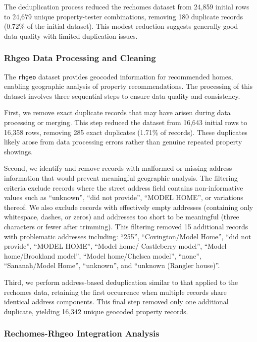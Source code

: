 \documentclass{article}
\begin{document}
The deduplication process reduced the rechomes dataset from 24,859 initial rows to 24,679 unique property-tester combinations, removing 180 duplicate records (0.72\% of the initial dataset). This modest reduction suggests generally good data quality with limited duplication issues.

\subsubsection{Rhgeo Data Processing and Cleaning}

The \texttt{rhgeo} dataset provides geocoded information for recommended homes, enabling geographic analysis of property recommendations. The processing of this dataset involves three sequential steps to ensure data quality and consistency.

First, we remove exact duplicate records that may have arisen during data processing or merging. This step reduced the dataset from 16,643 initial rows to 16,358 rows, removing 285 exact duplicates (1.71\% of records). These duplicates likely arose from data processing errors rather than genuine repeated property showings.

Second, we identify and remove records with malformed or missing address information that would prevent meaningful geographic analysis. The filtering criteria exclude records where the street address field contains non-informative values such as ``unknown'', ``did not provide'', ``MODEL HOME'', or variations thereof. We also exclude records with effectively empty addresses (containing only whitespace, dashes, or zeros) and addresses too short to be meaningful (three characters or fewer after trimming). This filtering removed 15 additional records with problematic addresses including: ``255'', ``Covington/Model Home'', ``did not provide'', ``MODEL HOME'', ``Model home/ Castleberry model'', ``Model home/Brookland model'', ``Model home/Chelsea model'', ``none'', ``Sananah/Model Home'', ``unknown'', and ``unknown (Rangler house)''.

Third, we perform address-based deduplication similar to that applied to the rechomes data, retaining the first occurrence when multiple records share identical address components. This final step removed only one additional duplicate, yielding 16,342 unique geocoded property records.

\subsubsection{Rechomes-Rhgeo Integration Analysis}
\end{document}
